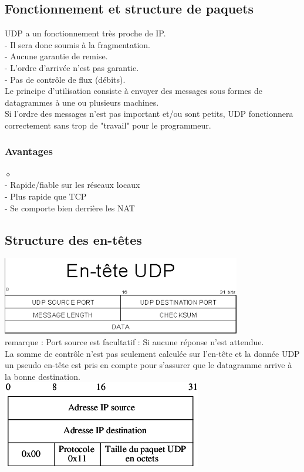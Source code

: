 \documentclass{article}
\begin{document}
\subsection{Fonctionnement et structure de paquets}
UDP a un fonctionnement très proche de IP. \\
- Il sera donc soumis à la fragmentation. \\
- Aucune garantie de remise. \\
- L'ordre d'arrivée n'est pas garantie. \\
- Pas de contrôle de flux (débits).
\\
Le principe d'utilisation consiste à envoyer des messages sous formes de datagrammes à une ou plusieurs machines. \\
Si l'ordre des messages n'est pas important et/ou sont petits, UDP fonctionnera correctement sans trop de "travail" pour le programmeur. \\
\subsubsection*{Avantages} 
$\diamond$\\
- Rapide/fiable sur les réseaux locaux \\
- Plus rapide que TCP \\
- Se comporte bien derrière les NAT \\
\subsection{Structure des en-têtes}
\includegraphics{image/udp.png}\\
remarque : Port source est facultatif : Si aucune réponse n'est attendue. \\
La somme de contrôle n'est pas seulement calculée sur l'en-tête et la donnée UDP un pseudo en-tête est pris en compte pour s'assurer que le datagramme arrive à la bonne destination. \\
\includegraphics{image/udp2.png}
\newpage
\end{document}
